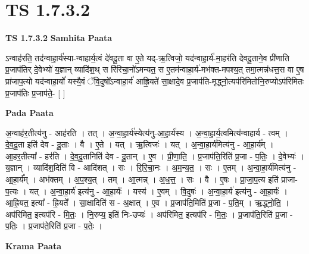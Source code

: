 \documentclass[17pt]{extarticle}
\begin{document}
\section{ TS 1.7.3.2 }

\textbf{TS 1.7.3.2 } \newline
\textbf{Samhita Paata} \newline

ऽन्वाह॑रति॒ तद॑न्वाहा॒र्य॑स्या-न्वाहार्य॒त्वं दे॑वदू॒ता वा ए॒ते यद्-ऋ॒त्विजो॒ यद॑न्वाहा॒र्य॑-मा॒हर॑ति देवदू॒ताने॒व प्री॑णाति प्र॒जाप॑तिर् दे॒वेभ्यो॑ य॒ज्ञान् व्यादि॑श॒थ् स रि॑रिचा॒नो॑ऽमन्यत॒ स ए॒तम॑न्वाहा॒र्य॑-मभ॑क्त-मपश्य॒त् तमा॒त्मन्न॑धत्त॒स वा ए॒ष प्रा॑जाप॒त्यो यद॑न्वाहा॒र्यो॑ यस्यै॒वं ॅवि॒दुषो᳚ऽन्वाहा॒र्य॑ आह्रि॒यते॑ सा॒क्षादे॒व प्र॒जाप॑ति-मृद्ध्नो॒त्यप॑रिमितोनि॒रुप्योऽप॑रिमितः प्र॒जाप॑तिः प्र॒जाप॑ते॒- [ ] \newline

\textbf{Pada Paata} \newline

अ॒न्वाह॑र॒तीत्य॑नु - आह॑रति । तत् । अ॒न्वा॒हा॒र्य॑स्येत्य॑नु-आ॒हा॒र्य॑स्य । अ॒न्वा॒हा॒र्य॒त्वमित्य॑न्वाहार्य - त्वम् । दे॒व॒दू॒ता इति॑ देव - दू॒ताः । वै । ए॒ते । यत् । ऋ॒त्विजः॑ । यत् । अ॒न्वा॒हा॒र्य॑मित्य॑नु - आ॒हा॒र्य᳚म् । आ॒हर॒तीत्या᳚ - हर॑ति । दे॒व॒दू॒तानिति॑ देव - दू॒तान् । ए॒व । प्री॒णा॒ति॒ । प्र॒जाप॑ति॒रिति॑ प्र॒जा - प॒तिः॒ । दे॒वेभ्यः॑ । य॒ज्ञान् । व्यादि॑श॒दिति॑ वि - आदि॑शत् । सः । रि॒रि॒चा॒नः । अ॒म॒न्य॒त॒ । सः । ए॒तम् । अ॒न्वा॒हा॒र्य॑मित्य॑नु - आ॒हा॒र्य᳚म् । अभ॑क्तम् । अ॒प॒श्य॒त् । तम् । आ॒त्मन्न् । अ॒ध॒त्त॒ । सः । वै । ए॒षः । प्रा॒जा॒प॒त्य इति॑ प्राजा-प॒त्यः । यत् । अ॒न्वा॒हा॒र्य॑ इत्य॑नु - आ॒हा॒र्यः॑ । यस्य॑ । ए॒वम् । वि॒दुषः॑ । अ॒न्वा॒हा॒र्य॑ इत्य॑नु - आ॒हा॒र्यः॑ । आ॒ह्रि॒यत॒ इत्या᳚ - ह्रि॒यते᳚ । सा॒क्षादिति॑ स - अ॒क्षात् । ए॒व । प्र॒जाप॑ति॒मिति॑ प्र॒जा - प॒ति॒म् । ऋ॒द्ध्नो॒ति॒ । अप॑रिमित॒ इत्यप॑रि - मि॒तः॒ । नि॒रुप्य॒ इति॑ निः-उप्यः॑ । अप॑रिमित॒ इत्यप॑रि - मि॒तः॒ । प्र॒जाप॑ति॒रिति॑ प्र॒जा - प॒तिः॒ । प्र॒जाप॑ते॒रिति॑ प्र॒जा - प॒तेः॒ ।  \newline


\textbf{Krama Paata} \newline
\end{document}
